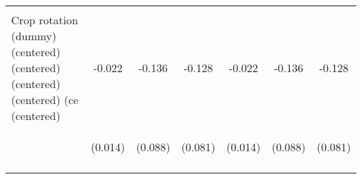 \begin{center}
\begin{tabular}{lcccccc}
\vspace{4pt} & \begin{footnotesize}[0.131]\end{footnotesize} & \begin{footnotesize}[0.393]\end{footnotesize} & \begin{footnotesize}[0.421]\end{footnotesize} & \begin{footnotesize}[0.131]\end{footnotesize} & \begin{footnotesize}[0.393]\end{footnotesize} & \begin{footnotesize}[0.421]\end{footnotesize} \\
Crop rotation (dummy) (centered) (centered) (centered) (centered) (ce (centered) & -0.022 & -0.136 & -0.128 & -0.022 & -0.136 & -0.128 \\
 & \begin{footnotesize}(0.014)\end{footnotesize} & \begin{footnotesize}(0.088)\end{footnotesize} & \begin{footnotesize}(0.081)\end{footnotesize} & \begin{footnotesize}(0.014)\end{footnotesize} & \begin{footnotesize}(0.088)\end{footnotesize} & \begin{footnotesize}(0.081)\end{footnotesize} \\
\vspace{4pt} & \begin{footnotesize}[0.112]\end{footnotesize} & \begin{footnotesize}[0.122]\end{footnotesize} & \begin{footnotesize}[0.111]\end{footnotesize} & \begin{footnotesize}[0.112]\end{footnotesize} & \begin{footnotesize}[0.122]\end{footnotesize} & \begin{footnotesize}[0.111]\end{footnotesize} \\

\end{tabular}
\end{center}
